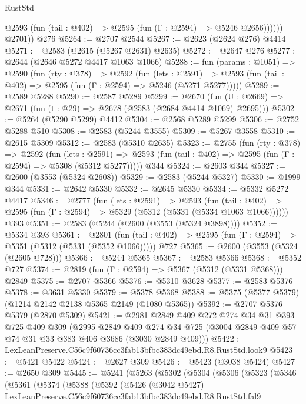 \begin{lexlean}{RustStd}
\begin{coremodule}
              @2593 (fun (tail : @402) => @2595 (fun (Γ : @2594) => @5246 @2656))))))
        @2701))
    @276
@5264 := @2707 @2544
@5267 := @2623 (@2624 @276) @4414
@5271 := @2583 (@2615 (@5267 @2631) @2635)
@5272 := @2647 @276
@5277 := @2644 (@2646 @5272 @4417 @1063 @1066)
@5288 := fun (params : @1051) =>
  @2590
    (fun (rty : @378) =>
    @2592
      (fun (lets : @2591) =>
      @2593 (fun (tail : @402) => @2595 (fun (Γ : @2594) => @5246 (@5271 @5277)))))
@5289 := @2589 @5288
@5290 := @2587 @5289
@5299 := @2670 (fun (U : @2669) => @2671 (fun (t : @29) => @2678 (@2583 (@2684 @4414 @1069) @2695)))
@5302 := @5264 (@5290 @5299) @4412
@5304 := @2568 @5289 @5299
@5306 := @2752 @5288 @510
@5308 := @2583 (@5244 @3555)
@5309 := @5267 @3558
@5310 := @2615 @5309
@5312 := @2583 (@5310 @2635)
@5323 := @2755
    (fun (rty : @378) =>
    @2592
      (fun (lets : @2591) =>
      @2593 (fun (tail : @402) => @2595 (fun (Γ : @2594) => @5308 (@5312 @5277)))))
    @344
@5324 := @2603 @344
@5327 := @2600 (@3553 (@5324 @2608))
@5329 := @2583 (@5244 @5327)
@5330 := @1999 @344
@5331 := @2642 @5330
@5332 := @2645 @5330
@5334 := @5332 @5272 @4417
@5346 := @2777
    (fun (lets : @2591) =>
    @2593
      (fun (tail : @402) => @2595 (fun (Γ : @2594) => @5329 (@5312 (@5331 (@5334 @1063 @1066))))))
    @393
@5351 := @2583 (@5244 (@2600 (@3553 (@5324 @3898))))
@5352 := @5334 @393
@5361 := @2801
    (fun (tail : @402) => @2595 (fun (Γ : @2594) => @5351 (@5312 (@5331 (@5352 @1066)))))
    @727
@5365 := @2600 (@3553 (@5324 (@2605 @728)))
@5366 := @5244 @5365
@5367 := @2583 @5366
@5368 := @5352 @727
@5374 := @2819 (fun (Γ : @2594) => @5367 (@5312 (@5331 @5368))) @2849
@5375 := @2707 @5366
@5376 := @5310 @3628
@5377 := @2583 @5376
@5378 := @3631 @5330
@5379 := @5378 @5368
@5388 := @5375 (@5377 @5379) (@1214 @2142 @2138 @5365 @2149 (@1080 @5365))
@5392 := @2707 @5376 @5379 (@2870 @5309)
@5421 := @2981
    @2849
    @409
    @272
    @274
    @34
    @31
    @393
    @725
    @409
    @309
    (@2995
      @2849
      @409
      @274
      @34
      @725
      (@3004 @2849 @409 @57 @74 @31 @33 @383 @406 @3686 (@3030 @2849 @409)))
@5422 := LexLeanPreserve.C56c9f60736cc3fab13bfbc383dc49ebd.R8.RustStd.look9
@5423 := @5421 @5422
@5424 := @2627 @309
@5426 := @5423 (@3038 @5424)
@5427 := @2650 @309
@5445 := @5241
    (@5263
      (@5302
        (@5304
          (@5306
            (@5323
              (@5346
                (@5361
                  (@5374
                    (@5388
                      (@5392
                        (@5426
                          (@3042 @5427)
                          LexLeanPreserve.C56c9f60736cc3fab13bfbc383dc49ebd.R8.RustStd.fal9

\end{coremodule}
\end{lexlean}
